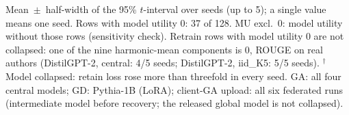 {\begin{longtable}{@{\extracolsep{\fill}}lllccc@{}}
\end{longtable}
Mean~$\pm$~half-width of the 95\% $t$-interval over seeds (up to 5); a single value means one seed. Rows with model utility 0: 37 of 128. MU excl.\ 0: model utility without those rows (sensitivity check). Retrain rows with model utility 0 are not collapsed: one of the nine harmonic-mean components is 0, ROUGE on real authors (DistilGPT-2, central: 4/5 seeds; DistilGPT-2, iid\_K5: 5/5 seeds). $^{\dagger}$Model collapsed: retain loss rose more than threefold in every seed. GA: all four central models; GD: Pythia-1B (LoRA); client-GA upload: all six federated runs (intermediate model before recovery; the released global model is not collapsed).\par
}
